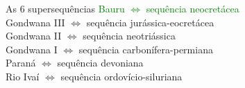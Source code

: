 \documentclass[aspectratio=10]{beamer} %
\begin{document}
\begin{frame}
\begin{columns}
\begin{column}{0.75\textwidth}
\begin{block}{As $6$ supersequências}
\textcolor{green}{Bauru $\Longleftrightarrow$  sequência neocretácea}\\
Gondwana III $\Longleftrightarrow$ sequência jurássica-eocretácea\\
Gondwana II $\Longleftrightarrow$ sequência neotriássica \\
Gondwana I $\Longleftrightarrow$ sequência carbonífera-permiana\\ 
Paraná $\Longleftrightarrow$ sequência devoniana\\
Rio Ivaí $\Longleftrightarrow$ sequência ordovício-siluriana\\
\cite{Vail_1977,assine_1994,milani_orogenias_1998}
\end{block}
\end{column}
\end{columns}
\end{frame}	
\end{document}
